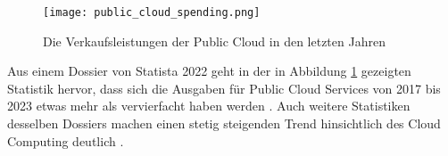 \begin{figure}[H]
    \texttt{[image: public\_cloud\_spending.png]}
    \caption{Die Verkaufsleistungen der Public Cloud in den letzten Jahren \cite[S. 8]{Statista2022}}
    \label{fig:public_cloud_spending}
\end{figure}

Aus einem Dossier von Statista 2022 geht in der in Abbildung \ref{fig:public_cloud_spending} gezeigten Statistik hervor, dass sich die Ausgaben für Public Cloud Services von 2017 bis 2023 etwas mehr als vervierfacht haben werden \cite[Vgl.][S. 8]{Statista2022}. Auch weitere Statistiken desselben Dossiers machen einen stetig steigenden Trend hinsichtlich des Cloud Computing deutlich \cite[Vgl. unter anderem][S. 11ff]{Statista2022}. \pagebreak